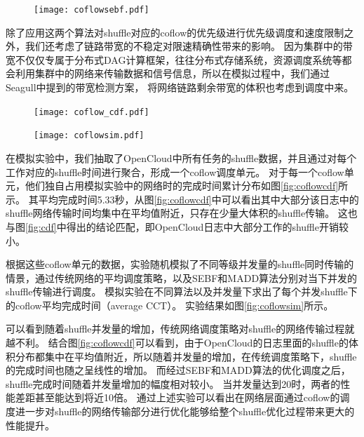 \begin{figure}[!htp]
	\centering
	\texttt{[image: coflowsebf.pdf]}
\end{figure}

除了应用这两个算法对shuffle对应的coflow的优先级进行优先级调度和速度限制之外，我们还考虑了链路带宽的不稳定对限速精确性带来的影响。
因为集群中的带宽不仅仅专属于分布式DAG计算框架，往往分布式存储系统，资源调度系统等都会利用集群中的网络来传输数据和信号信息，所以在模拟过程中，我们通过Seagull\cite{seagull}中提到的带宽检测方案，
将网络链路剩余带宽的体积也考虑到调度中来。

\begin{figure}[!htp]
	\centering
	\texttt{[image: coflow\_cdf.pdf]}
\end{figure}

\begin{figure}[!htp]
	\centering
	\texttt{[image: coflowsim.pdf]}
\end{figure}

在模拟实验中，我们抽取了OpenCloud中所有任务的shuffle数据，并且通过对每个工作对应的shuffle时间进行聚合，形成一个coflow调度单元。
对于每一个coflow单元，他们独自占用模拟实验中的网络时的完成时间累计分布如图\ref{fig:coflowcdf}所示。
其平均完成时间5.33秒，从图\ref{fig:coflowcdf}中可以看出其中大部分该日志中的shuffle网络传输时间均集中在平均值附近，只存在少量大体积的shuffle传输。
这也与图\ref{fig:cdf}中得出的结论匹配，即OpenCloud日志中大部分工作的shuffle开销较小。

根据这些coflow单元的数据，实验随机模拟了不同等级并发量的shuffle同时传输的情景，通过传统网络的平均调度策略，以及SEBF和MADD算法分别对当下并发的shuffle传输进行调度。
模拟实验在不同算法以及并发量下求出了每个并发shuffle下的coflow平均完成时间（average CCT）。
实验结果如图\ref{fig:coflowsim}所示。

可以看到随着shuffle并发量的增加，传统网络调度策略对shuffle的网络传输过程就越不利。
结合图\ref{fig:coflowcdf}可以看到，由于OpenCloud的日志里面的shuffle的体积分布都集中在平均值附近，所以随着并发量的增加，在传统调度策略下，shuffle的完成时间也随之呈线性的增加。
而经过SEBF和MADD算法的优化调度之后，shuffle完成时间随着并发量增加的幅度相对较小。
当并发量达到20时，两者的性能差距甚至能达到将近10倍。
通过上述实验可以看出在网络层面通过coflow的调度进一步对shuffle的网络传输部分进行优化能够给整个shuffle优化过程带来更大的性能提升。
